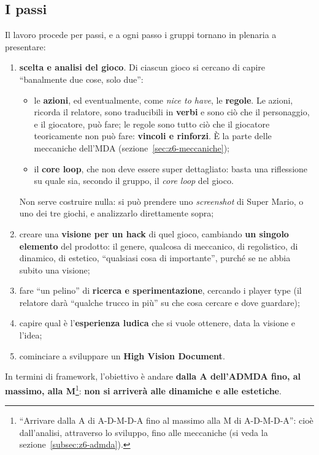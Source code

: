 \subsection{I passi}

Il lavoro procede per passi, e a ogni passo i gruppi tornano in plenaria a
presentare:
\begin{enumerate}
  \item \textbf{scelta e analisi del gioco}. Di ciascun gioco si cercano di
        capire ``banalmente due cose, solo due'':
        \begin{itemize}
          \item le \textbf{azioni}, ed eventualmente, come \emph{nice to have},
                le \textbf{regole}. Le azioni, ricorda il relatore, sono
                traducibili in \textbf{verbi} e sono ciò che il personaggio, e
                il giocatore, può fare; le regole sono tutto ciò che il
                giocatore teoricamente non può fare: \textbf{vincoli e
                rinforzi}. È la parte delle meccaniche dell'MDA
                (sezione~\ref{sec:z6-meccaniche});
          \item il \textbf{core loop}, che non deve essere super dettagliato:
                basta una riflessione su quale sia, secondo il gruppo, il
                \emph{core loop} del gioco.
        \end{itemize}
        Non serve costruire nulla: si può prendere uno \emph{screenshot} di
        Super Mario, o uno dei tre giochi, e analizzarlo direttamente sopra;
  \item creare una \textbf{visione per un hack} di quel gioco, cambiando
        \textbf{un singolo elemento} del prodotto: il genere, qualcosa di
        meccanico, di regolistico, di dinamico, di estetico, ``qualsiasi cosa di
        importante'', purché se ne abbia subito una visione;
  \item fare ``un pelino'' di \textbf{ricerca e sperimentazione}, cercando i
        player type (il relatore darà ``qualche trucco in più'' su che cosa
        cercare e dove guardare);
  \item capire qual è l'\textbf{esperienza ludica} che si vuole ottenere, data
        la visione e l'idea;
  \item cominciare a sviluppare un \textbf{High Vision Document}.
\end{enumerate}
In termini di framework, l'obiettivo è andare \textbf{dalla A dell'ADMDA fino, al
massimo, alla M}\footnote{``Arrivare dalla A di A-D-M-D-A fino al massimo alla M
di A-D-M-D-A'': cioè dall'analisi, attraverso lo sviluppo, fino alle meccaniche
(si veda la sezione~\ref{subsec:z6-admda}).}: \textbf{non si arriverà alle
dinamiche e alle estetiche}.

